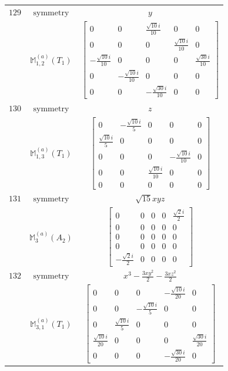 \documentclass[fleqn,8pt,landscape]{jsarticle}
\begin{document}
\begin{longtable}{ccc}
$ 129 $ & $ \text{symmetry} $ & $ y $ \\
$  $ & $ \mathbb{M}_{1,2}^{(a)}(T_{1}) $ & $ \begin{bmatrix} 0 & 0 & \frac{\sqrt{10} i}{10} & 0 & 0 \\ 0 & 0 & 0 & \frac{\sqrt{10} i}{10} & 0 \\ - \frac{\sqrt{10} i}{10} & 0 & 0 & 0 & \frac{\sqrt{30} i}{10} \\ 0 & - \frac{\sqrt{10} i}{10} & 0 & 0 & 0 \\ 0 & 0 & - \frac{\sqrt{30} i}{10} & 0 & 0 \end{bmatrix} $ \\ \hline
$ 130 $ & $ \text{symmetry} $ & $ z $ \\
$  $ & $ \mathbb{M}_{1,3}^{(a)}(T_{1}) $ & $ \begin{bmatrix} 0 & - \frac{\sqrt{10} i}{5} & 0 & 0 & 0 \\ \frac{\sqrt{10} i}{5} & 0 & 0 & 0 & 0 \\ 0 & 0 & 0 & - \frac{\sqrt{10} i}{10} & 0 \\ 0 & 0 & \frac{\sqrt{10} i}{10} & 0 & 0 \\ 0 & 0 & 0 & 0 & 0 \end{bmatrix} $ \\ \hline
$ 131 $ & $ \text{symmetry} $ & $ \sqrt{15} x y z $ \\
$  $ & $ \mathbb{M}_{3}^{(a)}(A_{2}) $ & $ \begin{bmatrix} 0 & 0 & 0 & 0 & \frac{\sqrt{2} i}{2} \\ 0 & 0 & 0 & 0 & 0 \\ 0 & 0 & 0 & 0 & 0 \\ 0 & 0 & 0 & 0 & 0 \\ - \frac{\sqrt{2} i}{2} & 0 & 0 & 0 & 0 \end{bmatrix} $ \\ \hline
$ 132 $ & $ \text{symmetry} $ & $ x^{3} - \frac{3 x y^{2}}{2} - \frac{3 x z^{2}}{2} $ \\
$  $ & $ \mathbb{M}_{3,1}^{(a)}(T_{1}) $ & $ \begin{bmatrix} 0 & 0 & 0 & - \frac{\sqrt{10} i}{20} & 0 \\ 0 & 0 & - \frac{\sqrt{10} i}{5} & 0 & 0 \\ 0 & \frac{\sqrt{10} i}{5} & 0 & 0 & 0 \\ \frac{\sqrt{10} i}{20} & 0 & 0 & 0 & \frac{\sqrt{30} i}{20} \\ 0 & 0 & 0 & - \frac{\sqrt{30} i}{20} & 0 \end{bmatrix} $ \\ \hline

\end{longtable}
\end{document}
